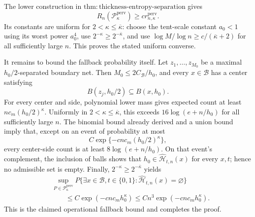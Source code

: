 The lower construction in \(\mathrm{thm:thickness\text{-}entropy\text{-}separation}\) gives
\[
 R_n(\mathcal P_\kappa^{\mathrm{perv}})\ge c r_{n,\kappa}^{\mathrm{perv}}.
\]
Its constants are uniform for \(2<\kappa\le\overline\kappa\): choose the tent-scale constant \(a_0<1\) using its worst power \(a_0^4\), use \(2^{-\kappa}\ge2^{-\overline\kappa}\), and use \(\log M/\log n\ge c/(\overline\kappa+2)\) for all sufficiently large \(n\).  This proves the stated uniform converse.

It remains to bound the fallback probability itself.  Let \(z_1,\ldots,z_{M_0}\) be a maximal \(h_0/2\)-separated boundary net.  Then \(M_0\le2C_{\mathcal B}/h_0\), and every \(x\in\mathcal B\) has a center satisfying
\[
 B(z_j,h_0/2)\subseteq B(x,h_0).
\]
For every center and side, polynomial lower mass gives expected count at least \(nc_m(h_0/2)^\kappa\).  Uniformly in \(2<\kappa\le\overline\kappa\), this exceeds \(16\log(e+n/h_0)\) for all sufficiently large \(n\).  The binomial bound already derived and a union bound imply that, except on an event of probability at most
\[
 C\exp\{-c n c_m(h_0/2)^\kappa\},
\]
every center-side count is at least \(8\log(e+n/h_0)\).  On that event's complement, the inclusion of balls shows that \(h_0\in\widehat{\mathcal H}_{t,n}(x)\) for every \(x,t\); hence no admissible set is empty.  Finally, \(2^{-\kappa}\ge2^{-\overline\kappa}\) yields
\[
 \begin{aligned}
 &\sup_{P\in\mathcal P_\kappa^{\mathrm{perv}}}
 P\{\exists x\in\mathcal B, t\in\{0,1\}:
 \widehat{\mathcal H}_{t,n}(x)=\varnothing\}\\
 &\qquad\le C\exp(-c n c_mh_0^\kappa)
 \le Cn^3\exp(-c n c_mh_0^\kappa).
 \end{aligned}
\]
This is the claimed operational fallback bound and completes the proof.